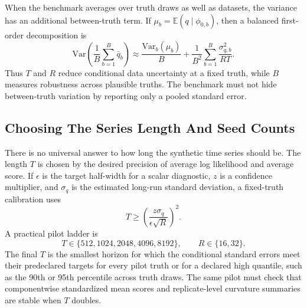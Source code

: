 \documentclass[11pt]{article}
\numberwithin{equation}{section}
\newcommand{\E}{\mathbb E}
\begin{document}
When the benchmark averages over truth draws as well as datasets, the variance
has an additional between-truth term.  If
\(\mu_b=\E(q\mid\phi_{0,b})\), then a balanced first-order decomposition is
\begin{equation}
  \mathrm{Var}\!\left(
  \frac{1}{B}\sum_{b=1}^{B}\bar q_b
  \right)
  \approx
  \frac{\mathrm{Var}_b(\mu_b)}{B}
  +
  \frac{1}{B^2}\sum_{b=1}^{B}
  \frac{\sigma_{q,b}^2}{RT}.
  \label{eq:p40-between-truth-variance}
\end{equation}
Thus \(T\) and \(R\) reduce conditional data uncertainty at a fixed truth, while
\(B\) measures robustness across plausible truths.  The benchmark must not hide
between-truth variation by reporting only a pooled standard error.

\subsection{Choosing The Series Length And Seed Counts}
\label{subsec:p40-horizon-calibration}

There is no universal answer to how long the synthetic time series should be.
The length \(T\) is chosen by the desired precision of average log likelihood
and average score.  If \(\epsilon\) is the target half-width for a scalar
diagnostic, \(z\) is a confidence multiplier, and \(\sigma_q\) is the estimated
long-run standard deviation, a fixed-truth calibration uses
\begin{equation}
  T
  \ge
  \left(
  \frac{z\sigma_q}{\epsilon\sqrt R}
  \right)^2.
  \label{eq:p40-horizon-rule}
\end{equation}
A practical pilot ladder is
\begin{equation}
  T\in\{512,1024,2048,4096,8192\},
  \qquad
  R\in\{16,32\}.
  \label{eq:p40-pilot-ladder}
\end{equation}
The final \(T\) is the smallest horizon for which the conditional standard
errors meet their predeclared targets for every pilot truth or for a declared
high quantile, such as the 90th or 95th percentile across truth draws.  The same
pilot must check that componentwise standardized mean scores and replicate-level
curvature summaries are stable when \(T\) doubles.
\end{document}
